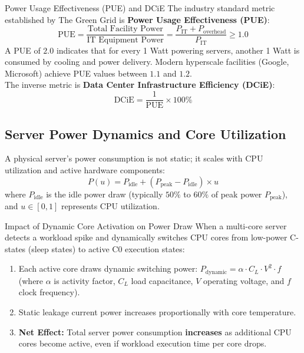 \begin{defbox}{Power Usage Effectiveness (PUE) and DCiE}
The industry standard metric established by The Green Grid is \textbf{Power Usage Effectiveness (PUE)}:
\begin{equation}
\text{PUE} = \frac{\text{Total Facility Power}}{\text{IT Equipment Power}} = \frac{P_{\text{IT}} + P_{\text{overhead}}}{P_{\text{IT}}} \ge 1.0
\end{equation}
A PUE of $2.0$ indicates that for every 1 Watt powering servers, another 1 Watt is consumed by cooling and power delivery. Modern hyperscale facilities (Google, Microsoft) achieve PUE values between $1.1$ and $1.2$.\\
The inverse metric is \textbf{Data Center Infrastructure Efficiency (DCiE)}:
\begin{equation}
\text{DCiE} = \frac{1}{\text{PUE}} \times 100\%
\end{equation}
\end{defbox}

\subsection{Server Power Dynamics and Core Utilization}
A physical server's power consumption is not static; it scales with CPU utilization and active hardware components:
\begin{equation}
P(u) = P_{\text{idle}} + (P_{\text{peak}} - P_{\text{idle}}) \times u
\end{equation}
where $P_{\text{idle}}$ is the idle power draw (typically $50\%$ to $60\%$ of peak power $P_{\text{peak}}$), and $u \in [0, 1]$ represents CPU utilization.

\begin{thmbox}{Impact of Dynamic Core Activation on Power Draw}
When a multi-core server detects a workload spike and dynamically switches CPU cores from low-power C-states (sleep states) to active C0 execution states:
\begin{enumerate}[leftmargin=*]
  \item Each active core draws dynamic switching power: $P_{\text{dynamic}} = \alpha \cdot C_L \cdot V^2 \cdot f$ (where $\alpha$ is activity factor, $C_L$ load capacitance, $V$ operating voltage, and $f$ clock frequency).
  \item Static leakage current power increases proportionally with core temperature.
  \item \textbf{Net Effect:} Total server power consumption \textbf{increases} as additional CPU cores become active, even if workload execution time per core drops.
\end{enumerate}
\end{thmbox}

